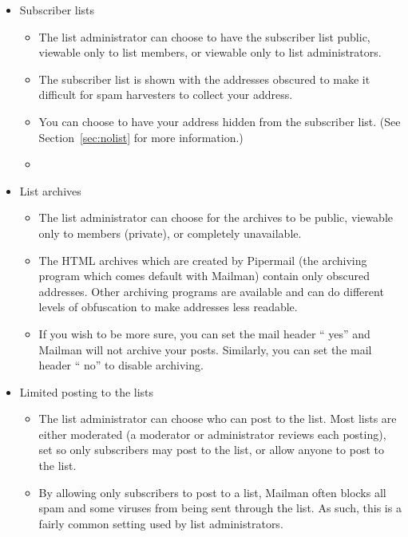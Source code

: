 \documentclass{howto}
\begin{document}
\begin{itemize}
	\item Subscriber lists
		\begin{itemize}
			\item The list administrator can choose to have the subscriber list
			public, viewable only to list members, or viewable only to list 
			administrators.
			\item The subscriber list is shown with the addresses obscured to
			make it difficult for spam harvesters to collect your address.
			\item You can choose to have your address hidden from the subscriber
			list.  (See Section~\ref{sec:nolist} for more information.) 
			\item {}
		\end{itemize}

	\item List archives
		\begin{itemize}
			\item The list administrator can choose for the archives to be public,
			viewable only to members (private), or completely unavailable.
			\item The HTML archives which are created by Pipermail (the 
			archiving program which comes default with Mailman) contain only
			obscured addresses.  Other archiving programs are available and can
			do different levels of obfuscation to make addresses less readable.
			\item If you wish to be more sure, you can set the mail header
			`` yes'' and Mailman will not archive your
			posts.  Similarly, you can set the mail header
			`` no'' to disable archiving.

		\end{itemize}

	\item Limited posting to the lists
		\begin{itemize}
			\item The list administrator can choose who can post to the list.
			Most lists are either moderated (a moderator or administrator
			reviews each posting), set so only subscribers may post to the list,
			or allow anyone to post to the list.
			\item By allowing only subscribers to post to a list, Mailman often 
			blocks all spam and some viruses from being sent through the list.
			As such, this is a fairly common setting used by list administrators.
		\end{itemize}


\end{itemize}
\end{document}
